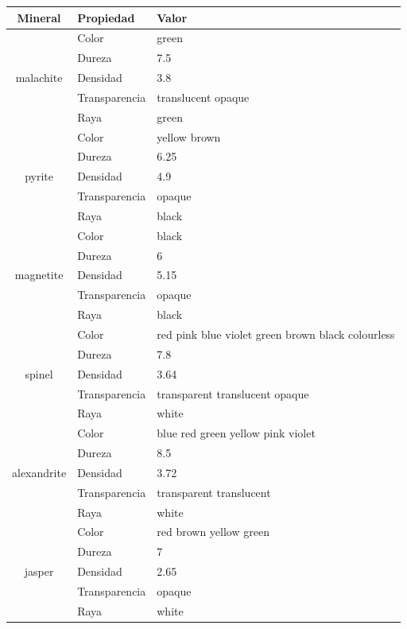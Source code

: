 \documentclass[a4paper,10pt]{article}
\begin{document}
\hspace{-1.0cm}
\begin{tabular}{|c|l|l|}
    \hline
    Mineral & Propiedad & Valor \\ \hline
    \multirow{5}{*}{malachite} 
        & Color & green \\
        & Dureza & 7.5 \\
        & Densidad & 3.8 \\
        & Transparencia & translucent opaque \\
        & Raya & green \\ \hline
    \multirow{5}{*}{pyrite} 
        & Color & yellow brown \\
        & Dureza & 6.25 \\
        & Densidad & 4.9 \\
        & Transparencia & opaque \\
        & Raya & black \\ \hline
    \multirow{5}{*}{magnetite} 
        & Color & black \\
        & Dureza & 6 \\
        & Densidad & 5.15 \\
        & Transparencia & opaque \\
        & Raya & black \\ \hline
    \multirow{5}{*}{spinel} 
        & Color & red pink blue violet green brown black colourless \\
        & Dureza & 7.8 \\
        & Densidad & 3.64 \\
        & Transparencia & transparent translucent opaque \\
        & Raya & white \\ \hline
    \multirow{5}{*}{alexandrite} 
        & Color & blue red green yellow pink violet \\
        & Dureza & 8.5 \\
        & Densidad & 3.72 \\
        & Transparencia & transparent translucent \\
        & Raya & white \\ \hline
    \multirow{5}{*}{jasper} 
        & Color & red brown yellow green \\
        & Dureza & 7 \\
        & Densidad & 2.65 \\
        & Transparencia & opaque \\
        & Raya & white \\ \hline

\end{tabular}
\end{document}
